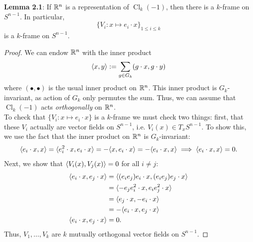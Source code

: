 \documentclass{amsart}
\DeclareMathOperator{\Cl}{\mathrm{Cl}}
\begin{document}
	\noindent \textbf{Lemma 2.1}: If $\mathbb{R}^n$ is a representation of $\Cl_k(-1)$, then there is a $k$-frame on $S^{n-1}$. In particular,
	$$
	\{V_i: x\mapsto e_i\cdot x\}_{1\leq i \leq k}
	$$
	is a $k$-frame on $S^{n-1}$.
%	
	\begin{proof}
		We can endow $\mathbb{R}^n$ with the inner product
		$$
		\langle x,y\rangle := \sum_{g\in G_k} (g\cdot x, g\cdot y)
		$$
		where $(\bullet,\bullet)$ is the usual inner product on $\mathbb{R}^n$. This inner product is $G_k$-invariant, as action of $G_k$ only permutes the sum. Thus, we can assume that $\Cl_k(-1)$ acts \textit{orthogonally} on $\mathbb{R}^n$.\\
		
		To check that $\{V_i: x\mapsto e_i\cdot x\}$ is a $k$-frame we must check two things: first, that these $V_i$ actually are vector fields on $S^{n-1}$, i.e. $V_i(x) \in T_xS^{n-1}$. To show this, we use the fact that the inner product on $\mathbb{R}^n$ is $G_k$-invariant:
		$$
		\langle e_i \cdot x,x\rangle = \langle e_i^2\cdot x, e_i \cdot x\rangle = -\langle x,e_i\cdot x\rangle = -\langle e_i\cdot x,x\rangle \implies \langle e_i\cdot x,x\rangle=0.
		$$
		Next, we show that $\langle V_i(x),V_j(x)\rangle=0$ for all $i\neq j$:
		\begin{align*}
		\langle e_i\cdot x,e_j\cdot x\rangle &= \langle(e_ie_j)e_i\cdot x,(e_ie_j)e_j\cdot x\rangle\\
		&= \langle-e_je_i^2 \cdot x, e_ie_j^2 \cdot x\rangle\\
		&= \langle e_j\cdot x,-e_i\cdot x\rangle\\
		&= -\langle e_i\cdot x,e_j\cdot x\rangle \\
		\langle e_i\cdot x,e_j\cdot x\rangle&=0.
		\end{align*}
		Thus, $V_1,\dots,V_k$ are $k$ mutually orthogonal vector fields on $S^{n-1}$.
%		
	\end{proof}\\
	
\end{document}
